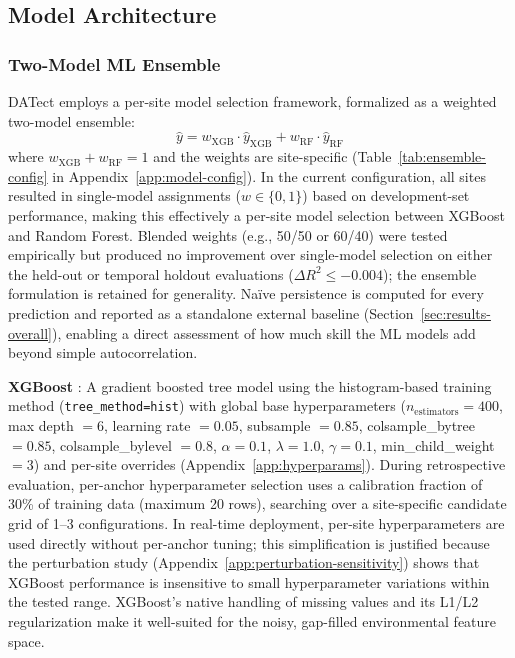 \documentclass[toxins,article,submit,moreauthors]{Definitions/mdpi}
\begin{document}
\subsection{Model Architecture}
\label{sec:model-selection}

\subsubsection{Two-Model ML Ensemble}

DATect employs a per-site model selection framework, formalized as a weighted two-model ensemble:
\begin{equation}
\hat{y} = w_{\text{XGB}} \cdot \hat{y}_{\text{XGB}} + w_{\text{RF}} \cdot \hat{y}_{\text{RF}}
\label{eq:ensemble}
\end{equation}
where $w_{\text{XGB}} + w_{\text{RF}} = 1$ and the weights are site-specific (Table~\ref{tab:ensemble-config} in Appendix~\ref{app:model-config}). In the current configuration, all sites resulted in single-model assignments ($w \in \{0, 1\}$) based on development-set performance, making this effectively a per-site model selection between XGBoost and Random Forest. Blended weights (e.g., 50/50 or 60/40) were tested empirically but produced no improvement over single-model selection on either the held-out or temporal holdout evaluations ($\Delta R^2 \leq -0.004$); the ensemble formulation is retained for generality. Na\"ive persistence is computed for every prediction and reported as a standalone external baseline (Section~\ref{sec:results-overall}), enabling a direct assessment of how much skill the ML models add beyond simple autocorrelation.

\textbf{XGBoost} \cite{Chen2016}: A gradient boosted tree model using the histogram-based training method (\texttt{tree\_method=hist}) with global base hyperparameters ($n_{\text{estimators}} = 400$, max depth $= 6$, learning rate $= 0.05$, subsample $= 0.85$, colsample\_bytree $= 0.85$, colsample\_bylevel $= 0.8$, $\alpha = 0.1$, $\lambda = 1.0$, $\gamma = 0.1$, min\_child\_weight $= 3$) and per-site overrides (Appendix~\ref{app:hyperparams}). During retrospective evaluation, per-anchor hyperparameter selection uses a calibration fraction of 30\% of training data (maximum 20 rows), searching over a site-specific candidate grid of 1--3 configurations. In real-time deployment, per-site hyperparameters are used directly without per-anchor tuning; this simplification is justified because the perturbation study (Appendix~\ref{app:perturbation-sensitivity}) shows that XGBoost performance is insensitive to small hyperparameter variations within the tested range. XGBoost's native handling of missing values and its L1/L2 regularization make it well-suited for the noisy, gap-filled environmental feature space.
\end{document}
